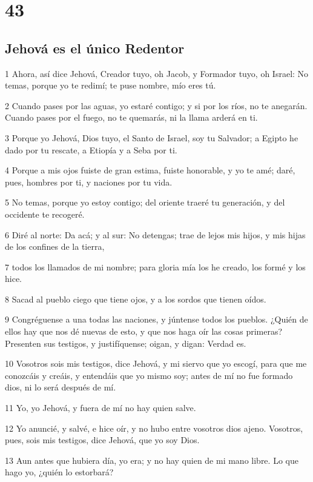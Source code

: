 \chapter{43}

\section*{Jehová es el único Redentor}

\par 1 Ahora, así dice Jehová, Creador tuyo, oh Jacob, y Formador tuyo, oh Israel: No temas, porque yo te redimí; te puse nombre, mío eres tú.
\par 2 Cuando pases por las aguas, yo estaré contigo; y si por los ríos, no te anegarán. Cuando pases por el fuego, no te quemarás, ni la llama arderá en ti.
\par 3 Porque yo Jehová, Dios tuyo, el Santo de Israel, soy tu Salvador; a Egipto he dado por tu rescate, a Etiopía y a Seba por ti.
\par 4 Porque a mis ojos fuiste de gran estima, fuiste honorable, y yo te amé; daré, pues, hombres por ti, y naciones por tu vida.
\par 5 No temas, porque yo estoy contigo; del oriente traeré tu generación, y del occidente te recogeré.
\par 6 Diré al norte: Da acá; y al sur: No detengas; trae de lejos mis hijos, y mis hijas de los confines de la tierra,
\par 7 todos los llamados de mi nombre; para gloria mía los he creado, los formé y los hice.
\par 8 Sacad al pueblo ciego que tiene ojos, y a los sordos que tienen oídos.
\par 9 Congréguense a una todas las naciones, y júntense todos los pueblos. ¿Quién de ellos hay que nos dé nuevas de esto, y que nos haga oír las cosas primeras? Presenten sus testigos, y justifíquense; oigan, y digan: Verdad es.
\par 10 Vosotros sois mis testigos, dice Jehová, y mi siervo que yo escogí, para que me conozcáis y creáis, y entendáis que yo mismo soy; antes de mí no fue formado dios, ni lo será después de mí.
\par 11 Yo, yo Jehová, y fuera de mí no hay quien salve.
\par 12 Yo anuncié, y salvé, e hice oír, y no hubo entre vosotros dios ajeno. Vosotros, pues, sois mis testigos, dice Jehová, que yo soy Dios.
\par 13 Aun antes que hubiera día, yo era; y no hay quien de mi mano libre. Lo que hago yo, ¿quién lo estorbará?
